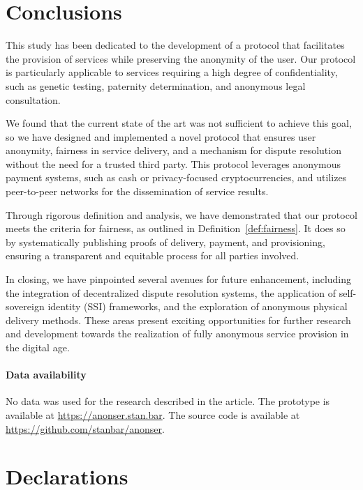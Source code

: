 \documentclass[pdftex,twocolumn,epjc3]{svjour3}
\begin{document}
\section{Conclusions}\label{sec:conclusion}

This study has been dedicated to the development of a protocol that facilitates the provision of services while preserving the anonymity of the user. Our protocol is particularly applicable to services requiring a high degree of confidentiality, such as genetic testing, paternity determination, and anonymous legal consultation.

We found that the current state of the art was not sufficient to achieve this goal, so we have designed and implemented a novel protocol that ensures user anonymity, fairness in service delivery, and a mechanism for dispute resolution without the need for a trusted third party. This protocol leverages anonymous payment systems, such as cash or privacy-focused cryptocurrencies, and utilizes peer-to-peer networks for the dissemination of service results.

\begin{sloppypar}
Through rigorous definition and analysis, we have demonstrated that our protocol meets the criteria for fairness, as outlined in Definition~\ref{def:fairness}. It does so by systematically publishing proofs of delivery, payment, and provisioning, ensuring a transparent and equitable process for all parties involved.
\end{sloppypar}

In closing, we have pinpointed several avenues for future enhancement, including the integration of decentralized dispute resolution systems, the application of self-sovereign identity (SSI) frameworks, and the exploration of anonymous physical delivery methods. These areas present exciting opportunities for further research and development towards the realization of fully anonymous service provision in the digital age.

\paragraph{Data availability}
No data was used for the research described in the article.
The prototype is available at \url{https://anonser.stan.bar}. 
The source code is available at \url{https://github.com/stanbar/anonser}.

\section*{Declarations}
\end{document}
